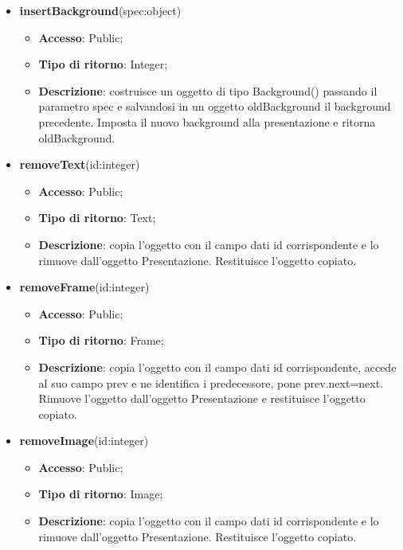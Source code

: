 {\begin{itemize}
\begin{itemize}
				\item \textbf{Accesso}: Public;
				\item \textbf{Tipo di ritorno}: Integer;
				\item \textbf{Descrizione}: costruisce un oggetto di tipo Video() passando il parametro spec. Inserisce l’oggetto così costruito nell’oggetto Presentazione.
			\end{itemize}
			\item \textbf{insertBackground}(spec:object)
			\begin{itemize}
				\item \textbf{Accesso}: Public;
				\item \textbf{Tipo di ritorno}: Integer;
				\item \textbf{Descrizione}: costruisce un oggetto di tipo Background() passando il parametro spec e salvandosi in un oggetto oldBackground il background precedente. Imposta il nuovo background alla presentazione e ritorna oldBackground.
			\end{itemize}
			\item \textbf{removeText}(id:integer)
			\begin{itemize}
				\item \textbf{Accesso}: Public;
				\item \textbf{Tipo di ritorno}: Text;
				\item \textbf{Descrizione}: copia l’oggetto con il campo dati id corrispondente e lo rimuove dall’oggetto Presentazione. Restituisce l’oggetto copiato.
			\end{itemize}
			\item \textbf{removeFrame}(id:integer)
			\begin{itemize}
				\item \textbf{Accesso}: Public;
				\item \textbf{Tipo di ritorno}: Frame;
				\item \textbf{Descrizione}: copia l’oggetto con il campo dati id corrispondente, accede al suo campo prev e ne identifica i predecessore, pone prev.next=next. Rimuove l’oggetto dall’oggetto Presentazione e restituisce l’oggetto copiato.
			\end{itemize}
			\item \textbf{removeImage}(id:integer)
			\begin{itemize}
				\item \textbf{Accesso}: Public;
				\item \textbf{Tipo di ritorno}: Image;
				\item \textbf{Descrizione}: copia l’oggetto con il campo dati id corrispondente e lo rimuove dall’oggetto Presentazione. Restituisce l’oggetto copiato.

\end{itemize}
\end{itemize}}
